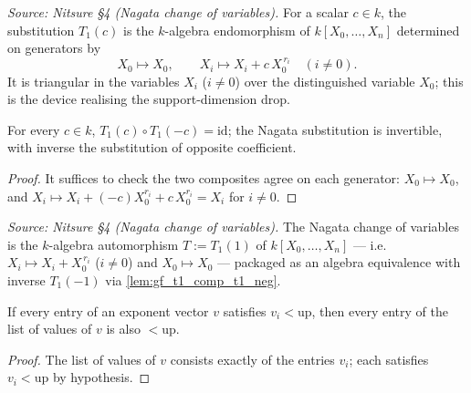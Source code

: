 \begin{definition}
  \label{def:gf_nagata_T1}
  \textit{Source: Nitsure \S4 (Nagata change of variables).}
  For a scalar \(c \in k\), the substitution \(T_1(c)\) is the \(k\)-algebra endomorphism
  of \(k[X_0, \dots, X_n]\) determined on generators by
  \[
    X_0 \mapsto X_0, \qquad X_i \mapsto X_i + c\,X_0^{\,r_i} \quad (i \ne 0).
  \]
  It is triangular in the variables \(X_i\) (\(i \ne 0\)) over the distinguished variable
  \(X_0\); this is the device realising the support-dimension drop.
\end{definition}

\begin{lemma}
  \label{lem:gf_t1_comp_t1_neg}
  For every \(c \in k\), \(T_1(c) \circ T_1(-c) = \mathrm{id}\); the Nagata substitution is
  invertible, with inverse the substitution of opposite coefficient.
\end{lemma}
\begin{proof}
  \leanok
  It suffices to check the two composites agree on each generator: \(X_0 \mapsto X_0\), and
  \(X_i \mapsto X_i + (-c)X_0^{r_i} + c\,X_0^{r_i} = X_i\) for \(i \ne 0\).
\end{proof}

\begin{definition}
  \label{def:gf_nagata_T}
  \textit{Source: Nitsure \S4 (Nagata change of variables).}
  The Nagata change of variables is the \(k\)-algebra automorphism \(T := T_1(1)\) of
  \(k[X_0, \dots, X_n]\) — i.e.\ \(X_i \mapsto X_i + X_0^{\,r_i}\) (\(i \ne 0\)) and
  \(X_0 \mapsto X_0\) — packaged as an algebra equivalence with inverse \(T_1(-1)\) via
  \cref{lem:gf_t1_comp_t1_neg}.
\end{definition}

\begin{lemma}
  \label{lem:gf_lt_up}
  If every entry of an exponent vector \(v\) satisfies \(v_i < \mathrm{up}\), then
  every entry of the list of values of \(v\) is also \(< \mathrm{up}\).
\end{lemma}
\begin{proof}

\leanok
  The list of values of \(v\) consists exactly of the entries \(v_i\); each satisfies
  \(v_i < \mathrm{up}\) by hypothesis.
\end{proof}

